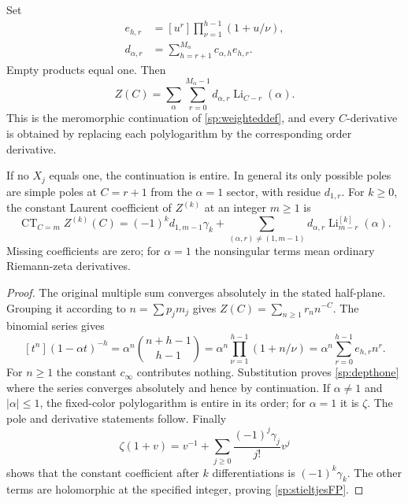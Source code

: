 \begin{theorem}
\label{sp:rationaltheorem}
Set
\begin{align}
 e_{h,r}
  &=[u^r]\prod_{\nu=1}^{h-1}(1+u/\nu),\label{sp:eh}\\
 d_{\alpha,r}
  &=\sum_{h=r+1}^{M_\alpha}c_{\alpha,h}e_{h,r}.
 \label{sp:dcoeff}
\end{align}
Empty products equal one.  Then
\begin{equation}\label{sp:depthone}
 Z(C)=\sum_\alpha\sum_{r=0}^{M_\alpha-1}
               d_{\alpha,r}\operatorname{Li}_{C-r}(\alpha).
\end{equation}
This is the meromorphic continuation of \eqref{sp:weighteddef}, and
every $C$-derivative is obtained by replacing each polylogarithm by
the corresponding order derivative.

If no $X_j$ equals one, the continuation is entire.  In general its
only possible poles are simple poles at $C=r+1$ from the $\alpha=1$
sector, with residue $d_{1,r}$.  For $k\geq0$, the constant Laurent
coefficient of $Z^{(k)}$ at an integer $m\geq1$ is
\begin{equation}\label{sp:stieltjesFP}
 \operatorname{CT}_{C=m} Z^{(k)}(C)
 =(-1)^k d_{1,m-1}\gamma_k
   +\sum_{(\alpha,r)\ne(1,m-1)}
      d_{\alpha,r}\operatorname{Li}_{m-r}^{[k]}(\alpha).
\end{equation}
Missing coefficients are zero; for $\alpha=1$ the nonsingular terms
mean ordinary Riemann-zeta derivatives.
\end{theorem}
\begin{proof}
The original multiple sum converges absolutely in the stated
half-plane.  Grouping it according to $n=\sum p_jm_j$ gives
$Z(C)=\sum_{n\geq1}r_n n^{-C}$.  The binomial series gives
\[
 [t^n](1-\alpha t)^{-h}
 =\alpha^n\binom{n+h-1}{h-1}
 =\alpha^n\prod_{\nu=1}^{h-1}(1+n/\nu)
 =\alpha^n\sum_{r=0}^{h-1}e_{h,r}n^r.
\]
For $n\geq1$ the constant $c_\infty$ contributes nothing.  Substitution
proves \eqref{sp:depthone} where the series converges absolutely and hence
by continuation.  If $\alpha\ne1$ and $|\alpha|\leq1$, the fixed-color
polylogarithm is entire in its order; for $\alpha=1$ it is $\zeta$.
The pole and derivative statements follow.  Finally
\[
 \zeta(1+v)=v^{-1}+
       \sum_{j\geq0}\frac{(-1)^j\gamma_j}{j!}v^j
\]
shows that the constant coefficient after $k$ differentiations is
$(-1)^k\gamma_k$.  The other terms are holomorphic at the specified
integer, proving \eqref{sp:stieltjesFP}.
\end{proof}

